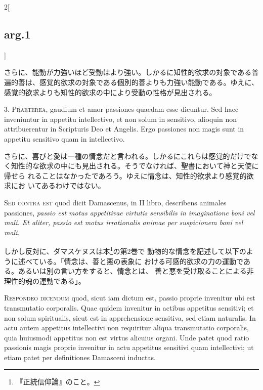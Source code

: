 \documentclass[paper=a4paper,fontsize=10pt,jafontsize=9pt,titlepage]{jlreq}
\begin{document}
\begin{paracol}{2}[\subsection{arg.1}]
\switchcolumn

さらに、能動が力強いほど受動はより強い。しかるに知性的欲求の対象である普
 遍的善は、感覚的欲求の対象である個別的善よりも力強い能動である。ゆえに、
 感覚的欲求よりも知性的欲求の中により受動の性格が見出される。


3. {\scshape Praeterea}, gaudium et amor passiones quaedam esse dicuntur. Sed haec
inveniuntur in appetitu intellectivo, et non solum in sensitivo,
alioquin non attribuerentur in Scripturis Deo et Angelis. Ergo passiones
non magis sunt in appetitu sensitivo quam in intellectivo.

\switchcolumn

さらに、喜びと愛は一種の情念だと言われる。しかるにこれらは感覚的だけでな
 く知性的な欲求の中にも見出される。そうでなければ、聖書において神と天使に帰せら
 れることはなかったであろう。ゆえに情念は、知性的欲求より感覚的欲求にお
 いてあるわけではない。

\switchcolumn*[\subsection{s.c.}]

{\scshape Sed contra est} quod dicit Damascenus, in II libro, describens animales
passiones, {\itshape passio est motus appetitivae virtutis sensibilis in
imaginatione boni vel mali. Et aliter, passio est motus irrationalis
animae per suspicionem boni vel mali}.

\switchcolumn

しかし反対に、ダマスケヌスは本\footnote{『正統信仰論』のこと。}の第2巻で
 動物的な情念を記述して以下のように述べている。「情念は、善と悪の表象に
 おける可感的欲求の力の運動である。あるいは別の言い方をすると、情念とは、
 善と悪を受け取ることによる非理性的魂の運動である」。


{\scshape Respondeo dicendum} quod, sicut iam dictum est, passio proprie invenitur
ubi est transmutatio corporalis. Quae quidem invenitur in actibus
appetitus sensitivi; et non solum spiritualis, sicut est in
apprehensione sensitiva, sed etiam naturalis. In actu autem appetitus
intellectivi non requiritur aliqua transmutatio corporalis, quia
huiusmodi appetitus non est virtus alicuius organi. Unde patet quod
ratio passionis magis proprie invenitur in actu appetitus sensitivi quam
intellectivi; ut etiam patet per definitiones Damasceni inductas.


\end{paracol}
\end{document}
